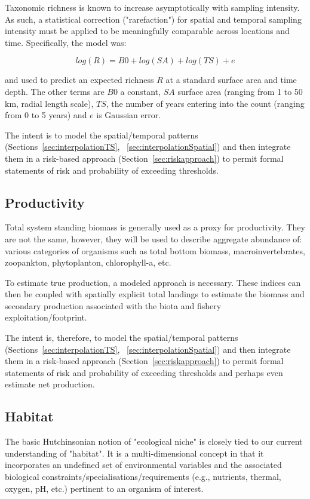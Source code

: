 \documentclass[letterpaper,portrait,11pt]{scrartcl}
\numberwithin{equation}{section}		%
\numberwithin{figure}{section}		%
\numberwithin{table}{section}				%
\begin{document}
Taxonomic richness is known to increase asymptotically with sampling intensity. As such, a statistical correction ("rarefaction") for spatial and temporal sampling intensity must be applied to be meaningfully comparable across locations and time. Specifically, the model was:

\[
log(R) = B0 + log(SA) + log(TS) + e
\]

and used to predict an expected richness $R$ at a standard surface area and time depth. The other terms are $B0$ a constant, $SA$ surface area (ranging from 1 to 50 km, radial length scale), $TS$, the number of years entering into the count (ranging from 0 to 5 years) and $e$ is Gaussian error.  

The intent is to model the spatial/temporal patterns (Sections~\ref{sec:interpolationTS}, ~\ref{sec:interpolationSpatial}) and then integrate them in a risk-based approach (Section~\ref{sec:riskapproach}) to permit formal statements of risk and probability of exceeding thresholds. 

\clearpage
\subsection{Productivity}

Total system standing biomass is generally used as a proxy for productivity. They are not the same, however, they will be used to describe aggregate abundance of: various categories of organisms such as total bottom biomass, macroinvertebrates, zoopankton, phytoplanton, chlorophyll-a, etc. 

To estimate true production, a modeled approach is necessary. These indices can then be coupled with spatially explicit total landings to estimate the biomass and secondary production associated with the biota and fishery exploitation/footprint. 

The intent is, therefore, to model the spatial/temporal patterns (Sections~\ref{sec:interpolationTS}, ~\ref{sec:interpolationSpatial}) and then integrate them in a risk-based approach (Section~\ref{sec:riskapproach}) to permit formal statements of risk and probability of exceeding thresholds and perhaps even estimate net production. 


\subsection{Habitat}

The basic Hutchinsonian notion of "ecological niche" is closely tied to our current understanding of "habitat". It is a multi-dimensional concept in that it incorporates an undefined set of  environmental variables and the associated biological constraints/specialisations/requirements (e.g., nutrients, thermal, oxygen, pH, etc.) pertinent to an organism of interest. 
\end{document}
